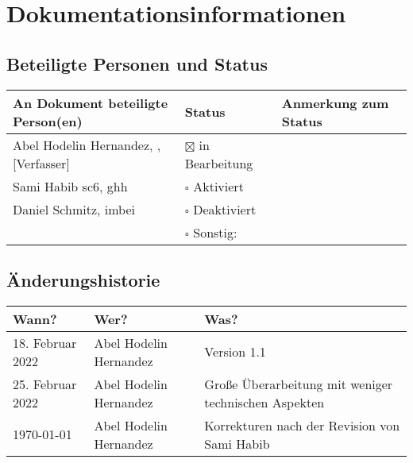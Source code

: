 \chapter{Dokumentationsinformationen}

\section{Beteiligte Personen und Status}
\begin{table}[ht]
	\centering  	
	\begin{tabular}{||l|l|l||}   		
		\hline
		An Dokument beteiligte Person(en) & Status & Anmerkung zum Status \\
		\hline\hline
		Abel Hodelin Hernandez, \acsu{sc6}, \acsu{ghh} [Verfasser] &  $\boxtimes$ in Bearbeitung & \\
		
		Sami Habib \acs{sc6}, \acs{ghh} & $\square$ Aktiviert & \\
		
		Daniel Schmitz, \acs{imbei} & $\square$ Deaktiviert &  \\
		
		& $\square$ Sonstig: &   \\
		\hline
	\end{tabular}
\end{table}

\section{Änderungshistorie}

\begin{table}[ht]
	\centering  	
	\begin{tabular}{||l|l|p{8.5cm}||}   		
		\hline
		Wann? & Wer? & Was? \\
		\hline\hline
		18. Februar 2022 &  Abel Hodelin Hernandez & Version 1.1 \\
		\hline
		\hline\hline
		25. Februar 2022 &  Abel Hodelin Hernandez & Große Überarbeitung mit weniger technischen Aspekten \\
		\hline
		\today &  Abel Hodelin Hernandez & Korrekturen nach der Revision von Sami Habib \\
		\hline
	\end{tabular}
\end{table}